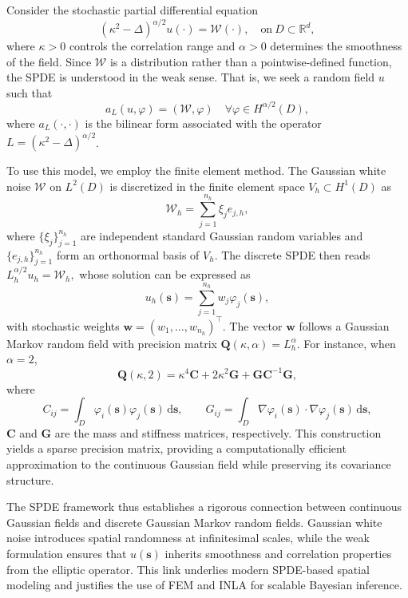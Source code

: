 \documentclass[
  12pt]{article}
\begin{document}
Consider the stochastic partial differential equation
\begin{equation}
    (\kappa^2 - \Delta)^{\alpha/2} u(\cdot) = \mathcal{W}(\cdot), 
  \quad  \text{on} \ D \subset \mathbb{R}^d,
  \label{standardspde}
\end{equation}
where \( \kappa > 0 \) controls the correlation range and \( \alpha > 0 \) determines the smoothness of the field.
Since \( \mathcal{W} \) is a distribution rather than a pointwise-defined function, the SPDE is understood in the weak sense.
That is, we seek a random field \( u \) such that
\[
  a_L(u, \varphi) = (\mathcal{W}, \varphi)
  \quad \forall \varphi \in H^{\alpha/2}(D),
\]
where \( a_L(\cdot,\cdot) \) is the bilinear form associated with the operator \( L = (\kappa^2 - \Delta)^{\alpha/2} \).

To use this model, we employ the finite element method.
The Gaussian white noise \( \mathcal{W} \) on \( L^2(D) \) is discretized in the finite element space \( V_h \subset H^1(D) \) as
\[
  \mathcal{W}_h = \sum_{j=1}^{n_h} \xi_j e_{j,h},
\]
where \( \{\xi_j\}_{j=1}^{n_h} \) are independent standard Gaussian random variables and \( \{e_{j,h}\}_{j=1}^{n_h} \) form an orthonormal basis of \( V_h \).
The discrete SPDE then reads $L_h^{\alpha/2} u_h = \mathcal{W}_h,$
whose solution can be expressed as
\[
  u_h(\boldsymbol{s}) = \sum_{j=1}^{n_h} w_j \varphi_j(\boldsymbol{s}),
\]
with stochastic weights \( \boldsymbol{w} = (w_1, \ldots, w_{n_h})^\top \).
The vector \( \boldsymbol{w} \) follows a Gaussian Markov random field with precision matrix \( \boldsymbol{Q}(\kappa, \alpha) = L_h^{\alpha} \).
For instance, when \( \alpha = 2 \),
\[
  \boldsymbol{Q}(\kappa, 2) = \kappa^4 \boldsymbol{C} + 2\kappa^2 \boldsymbol{G} + \boldsymbol{G}\boldsymbol{C}^{-1}\boldsymbol{G},
\]
where
\[
  C_{ij} = \int_D \varphi_i(\boldsymbol{s})\varphi_j(\boldsymbol{s})\,\mathrm{d}\boldsymbol{s},
  \qquad 
  G_{ij} = \int_D \nabla\varphi_i(\boldsymbol{s}) \cdot \nabla\varphi_j(\boldsymbol{s})\,\mathrm{d}\boldsymbol{s},
\]
$\boldsymbol{C}$ and $\boldsymbol{G}$ are the mass and stiffness matrices, respectively. This construction yields a sparse precision matrix, providing a computationally efficient approximation to the continuous Gaussian field while preserving its covariance structure.

The SPDE framework thus establishes a rigorous connection between continuous Gaussian fields and discrete Gaussian Markov random fields. Gaussian white noise introduces spatial randomness at infinitesimal scales, while the weak formulation ensures that \( u(\boldsymbol{s}) \) inherits smoothness and correlation properties from the elliptic operator. This link underlies modern SPDE-based spatial modeling and justifies the use of FEM and INLA for scalable Bayesian inference.
\end{document}
